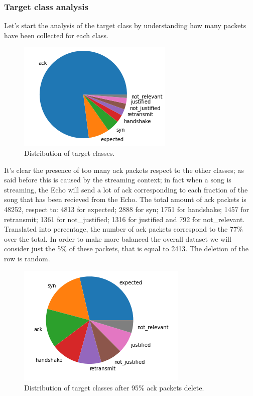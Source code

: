 \documentclass[sigconf]{acmart}
\begin{document}
	\subsubsection{Target class analysis}
	Let's start the analysis of the target class by understanding how many packets have been collected for each class.
	\begin{figure}[h!]
            \includegraphics[width=0.8\linewidth]{img/target_class_distribution.png}
            \caption{Distribution of target classes.}
            \label{fig:target_class_distribution}
        \end{figure}
	
It's clear the presence of too many ack packets respect to the other classes; as said before this is caused by the streaming context; in fact when a song is streaming, the Echo will send a lot of ack corresponding to each fraction of the song that has been recieved from the Echo. The total amount of ack packets is 48252, respect to: 4813 for expected; 2888 for syn; 1751 for handshake; 1457 for retransmit; 1361 for not\_justified; 1316 for justified and 792 for not\_relevant. Translated into percentage, the number of ack packets correspond to the 77\% over the total.  In order to make more balanced the overall dataset we will consider just the 5\% of these packets, that is equal to 2413. The deletion of the row is random.
	\begin{figure}[h!]
            \includegraphics[width=0.8\linewidth]{img/target_class_distribution_after_del.png}
            \caption{Distribution of target classes after 95\% ack packets delete.}
            \label{fig:target_class_distribution_after_del}
        \end{figure}
\end{document}
